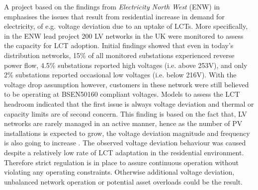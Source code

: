 A project based on the findings from \textit{Electricity North West} (ENW) in \cite{ElectricityNorthWestLtd2014} emphasises the issues that result from residential increase in demand for electricity, of e.g. voltage deviation due to an uptake of LCTs.
More specifically, in the ENW lead project 200 LV networks in the UK were monitored to assess the capacity for LCT adoption.
Initial findings showed that even in today's distribution networks, 15\% of all monitored substations experienced reverse power flow, 4.5\% substations reported high voltages (i.e. above 253V), and only 2\% substations reported occasional low voltages (i.e. below 216V).
With the voltage drop assumption however, customers in these network were still believed to be operating at BSEN50160 compliant voltages.
Models to assess the LCT headroom indicated that the first issue is always voltage deviation and thermal or capacity limits are of second concern.
This finding is based on the fact that, LV networks are rarely managed in an active manner, hence as the number of PV installations is expected to grow, the voltage deviation magnitude and frequency is also going to increase \cite{Woyte2006}.
%
%
The observed voltage deviation behaviour was caused despite a relatively low rate of LCT adaptation in the residential environment.
Therefore strict regulation is in place to assure continuous operation without violating any operating constraints.
Otherwise additional voltage deviation, unbalanced network operation or potential asset overloads could be the result.

